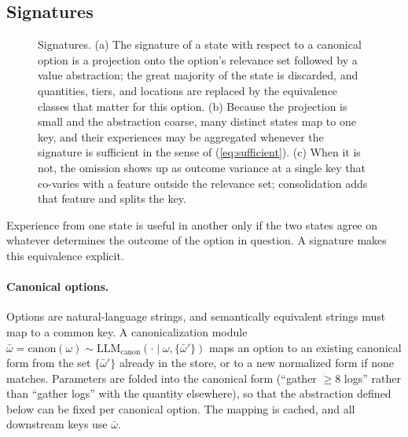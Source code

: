 \documentclass[11pt]{article}
\newcommand{\llm}[1]{\mathrm{LLM}_{\mathrm{#1}}}
\begin{document}
\subsection{Signatures}
\label{sec:signature}
\begin{figure}[t]
\centering

\caption{Signatures. (a) The signature of a state with respect to a canonical option is a projection onto the option's relevance set followed by a value abstraction; the great majority of the state is discarded, and quantities, tiers, and locations are replaced by the equivalence classes that matter for this option. (b) Because the projection is small and the abstraction coarse, many distinct states map to one key, and their experiences may be aggregated whenever the signature is sufficient in the sense of (\ref{eq:sufficient}). (c) When it is not, the omission shows up as outcome variance at a single key that co-varies with a feature outside the relevance set; consolidation adds that feature and splits the key.}
\label{fig:signature}
\end{figure}


Experience from one state is useful in another only if the two states agree on whatever determines the outcome of the option in question. A signature makes this equivalence explicit.

\paragraph{Canonical options.}
Options are natural-language strings, and semantically equivalent strings must map to a common key. A canonicalization module $\bar\omega=\mathrm{canon}(\omega)\sim\llm{canon}(\cdot\mid\omega,\{\bar\omega'\})$ maps an option to an existing canonical form from the set $\{\bar\omega'\}$ already in the store, or to a new normalized form if none matches. Parameters are folded into the canonical form (``gather $\ge 8$ logs'' rather than ``gather logs'' with the quantity elsewhere), so that the abstraction defined below can be fixed per canonical option. The mapping is cached, and all downstream keys use $\bar\omega$.
\end{document}

